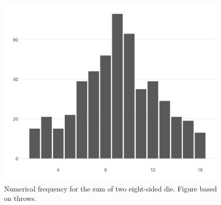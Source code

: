 \documentclass[12pt]{article}
\theoremstyle{definition}
\begin{document}
\begin{figure}[tbh!]
\centering
\includegraphics[width=.8\linewidth]{500_8/hist.png}
\caption[]{Numerical frequency for the sum of two eight-sided die. Figure based on throws.}
\label{fig:hist_baseline}
\end{figure}


%

\end{document}
